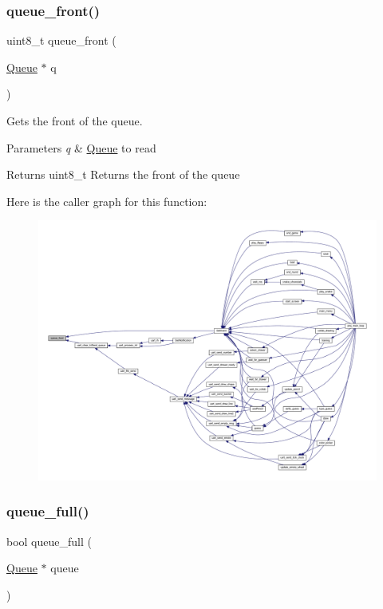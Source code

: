 \subsubsection{\texorpdfstring{queue\+\_\+front()}{queue\_front()}}
{\footnotesize\ttfamily uint8\+\_\+t queue\+\_\+front (\begin{DoxyParamCaption}\item[{\mbox{\hyperlink{struct_queue}{Queue}} $\ast$}]{q }\end{DoxyParamCaption})}



Gets the front of the queue. 


\begin{DoxyParams}{Parameters}
{\em q} & \mbox{\hyperlink{struct_queue}{Queue}} to read \\
\hline
\end{DoxyParams}
\begin{DoxyReturn}{Returns}
uint8\+\_\+t Returns the front of the queue 
\end{DoxyReturn}
Here is the caller graph for this function\+:\nopagebreak
\begin{figure}[H]
\begin{center}
\leavevmode
\includegraphics[width=350pt]{group__queue_ga6916e93facd123dd3fb655965b440e0e_icgraph}
\end{center}
\end{figure}
\mbox{\label{group__queue_gaca6621b01a2bae967c3c747bb6d855db}} 
\subsubsection{\texorpdfstring{queue\+\_\+full()}{queue\_full()}}
{\footnotesize\ttfamily bool queue\+\_\+full (\begin{DoxyParamCaption}\item[{\mbox{\hyperlink{struct_queue}{Queue}} $\ast$}]{queue }\end{DoxyParamCaption})}



